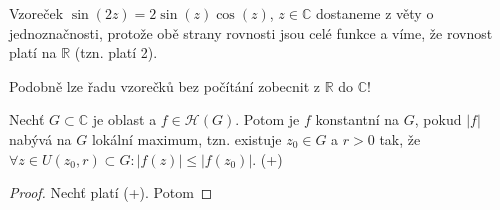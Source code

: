 \begin{example}
Vzoreček $\sin (2z)=2\sin (z) \cos (z)$, $z \in \mathbb{C}$ dostaneme z věty o jednoznačnosti, protože obě strany rovnosti jsou celé funkce a víme, že rovnost platí na $\mathbb{R}$ (tzn. platí 2).
\end{example}

\begin{example}
Podobně lze řadu vzorečků bez počítání zobecnit z $\mathbb{R}$ do $\mathbb{C}$!
\end{example}

\begin{theorem}
Nechť $G \subset \mathbb{C}$ je oblast a $f\in \mathcal{H}(G)$. Potom je $f$ konstantní na $G$, pokud $|f|$ nabývá na $G$ lokální maximum, tzn. existuje $z_0 \in G$ a $r>0$ tak, že $\forall z \in U(z_0,r) \subset G: |f(z)| \leq |f(z_0)|$. (+)
\end{theorem}

\begin{proof}
Nechť platí (+). Potom
\end{proof}
